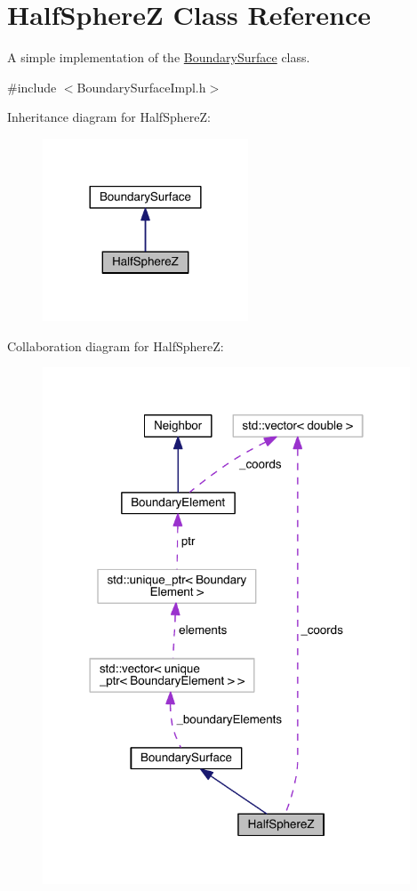 \hypertarget{classHalfSphereZ}{\section{Half\+Sphere\+Z Class Reference}
\label{classHalfSphereZ}
}


A simple implementation of the \hyperlink{classBoundarySurface}{Boundary\+Surface} class.  




{\ttfamily \#include $<$Boundary\+Surface\+Impl.\+h$>$}



Inheritance diagram for Half\+Sphere\+Z\+:\nopagebreak
\begin{figure}[H]
\begin{center}
\leavevmode
\includegraphics[width=173pt]{classHalfSphereZ__inherit__graph}
\end{center}
\end{figure}


Collaboration diagram for Half\+Sphere\+Z\+:
\nopagebreak
\begin{figure}[H]
\begin{center}
\leavevmode
\includegraphics[width=310pt]{classHalfSphereZ__coll__graph}
\end{center}
\end{figure}
